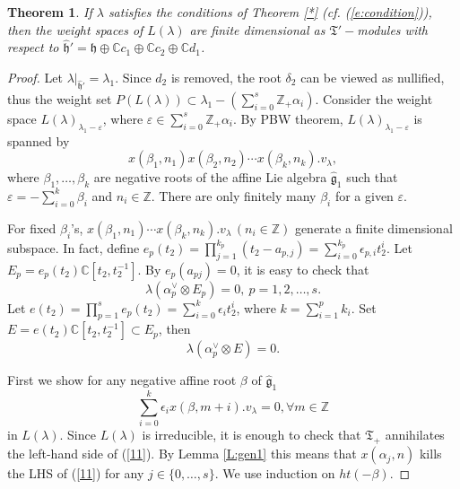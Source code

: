 \documentclass[11pt]{amsproc}
\newtheorem{theorem}{Theorem}[section]
\theoremstyle{definition}
\theoremstyle{remark}
\numberwithin{equation}{section} \errorcontextlines=0
\begin{document}
\begin{theorem}
If $\lambda$ satisfies the conditions of Theorem \ref{*} (cf. (\ref{e:condition})), then the
weight spaces of $L(\lambda)$ are finite dimensional as
$\mathfrak T'-$modules with respect to
$\hat{\mathfrak{h}}'=\mathfrak{h}\oplus\mathbb{C}c_1\oplus\mathbb{C}c_2\oplus\mathbb{C}d_1$.

\end{theorem}
\begin{proof}
Let
$\lambda|_{\hat{\mathfrak{h}}'}=\lambda_1$.
Since $d_2$ is removed, the root $\delta_2$ can be viewed as
nullified, thus the weight set $P(L(\lambda))\subset
\lambda_1-(\sum\limits_{i=0}^s \mathbb{Z}_+\alpha_i)$. Consider the
weight space $L(\lambda)_{\lambda_1-\varepsilon}$, where
$\varepsilon\in\sum\limits_{i=0}^s\mathbb{Z}_+\alpha_i$. By PBW
theorem, $L(\lambda)_{\lambda_1-\varepsilon}$ is spanned by
\begin{equation}\label{10}
x(\beta_1,n_1)x(\beta_2,n_2)\cdots x(\beta_k,n_k).v_{\lambda},
\end{equation}
where $\beta_1,\ldots,\beta_k$ are negative roots of the
affine Lie algebra $\hat{\mathfrak g}_1$ such that $\varepsilon=-\sum\limits_{i=0}^k
\beta_i$ and $n_i\in\mathbb{Z}$. There are only finitely many $\beta_i$
for a given $\varepsilon$.

For fixed $\beta_i$'s, $x(\beta_1,n_1)\cdots
x(\beta_k,n_k).v_{\lambda}\, (n_i\in\mathbb{Z})$ generate a finite
dimensional subspace. In fact, define
$e_p(t_2)=\prod\limits_{j=1}^{k_p}(t_2-a_{p,j})=\sum\limits_{i=0}^{k_p}\epsilon_{p,i}
t_2^i$. Let $E_p=e_p(t_2)\mathbb{C}[t_2,t_2^{-1}]$. By
$e_p(a_{pj})=0${\color{blue},} it is easy to check that
$$\lambda(\alpha_{p}^{\vee}\otimes E_p)=0,~p=1,2,\ldots,s.
$$
Let
$e(t_2)=\prod\limits_{p=1}^{s}e_p(t_2)=\sum\limits_{i=0}^{k}\epsilon_{i}
t_2^i$, where $k=\sum\limits_{i=1}^{p}k_i$. Set $E=e(t_2)\mathbb
C[t_2, t_2^{-1}]\subset E_p$, then
\begin{equation}\label{***}
\lambda(\alpha_{p}^{\vee}\otimes E)=0.
\end{equation}

First we show for any negative affine root $\beta$ of
$\hat{\mathfrak g}_1$
\begin{equation}\label{11}
\sum\limits_{i=0}^k\epsilon_ix(\beta,m+i).v_{\lambda}=0,\forall
m\in\mathbb{Z}
\end{equation}
in $L(\lambda)$. Since $L(\lambda)$ is
irreducible, it is enough to check that $\mathfrak T_+$ annihilates
the left-hand side of (\ref{11}).  By Lemma \ref{L:gen1} this means that
$x(\alpha_j, n)$ kills the LHS of (\ref{11}) for any $j\in
\{0,\ldots, s\}$. We use induction on $ht(-\beta)$.


\end{proof}
\end{document}
